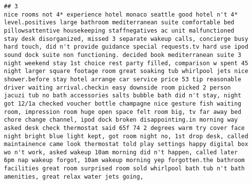 \documentclass[
]{article}
\begin{document}
\begin{verbatim}
## 3                                                                                                                                                                                                                                                                       nice rooms not 4* experience hotel monaco seattle good hotel n't 4* level.positives large bathroom mediterranean suite comfortable bed pillowsattentive housekeeping staffnegatives ac unit malfunctioned stay desk disorganized, missed 3 separate wakeup calls, concierge busy hard touch, did n't provide guidance special requests.tv hard use ipod sound dock suite non functioning. decided book mediterranean suite 3 night weekend stay 1st choice rest party filled, comparison w spent 45 night larger square footage room great soaking tub whirlpool jets nice shower.before stay hotel arrange car service price 53 tip reasonable driver waiting arrival.checkin easy downside room picked 2 person jacuzi tub no bath accessories salts bubble bath did n't stay, night got 12/1a checked voucher bottle champagne nice gesture fish waiting room, impression room huge open space felt room big, tv far away bed chore change channel, ipod dock broken disappointing.in morning way asked desk check thermostat said 65f 74 2 degrees warm try cover face night bright blue light kept, got room night no, 1st drop desk, called maintainence came look thermostat told play settings happy digital box wo n't work, asked wakeup 10am morning did n't happen, called later 6pm nap wakeup forgot, 10am wakeup morning yep forgotten.the bathroom facilities great room surprised room sold whirlpool bath tub n't bath amenities, great relax water jets going,  

\end{verbatim}
\end{document}
